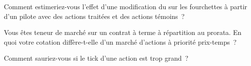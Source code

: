 \begin{interviewq}\label{iq:mx:tick-size-queues-and-priority:4}
Comment estimeriez-vous l'effet d'une modification du  sur les fourchettes à partir d'un pilote avec des actions traitées et des actions témoins~?
\end{interviewq}

\begin{interviewq}\label{iq:mx:tick-size-queues-and-priority:5}
Vous êtes teneur de marché sur un contrat à terme à répartition au prorata. En quoi votre cotation diffère-t-elle d'un marché d'actions à priorité prix-temps~?
\end{interviewq}

\begin{interviewq}\label{iq:mx:tick-size-queues-and-priority:6}
Comment sauriez-vous si le tick d'une action est trop grand~?
\end{interviewq}

